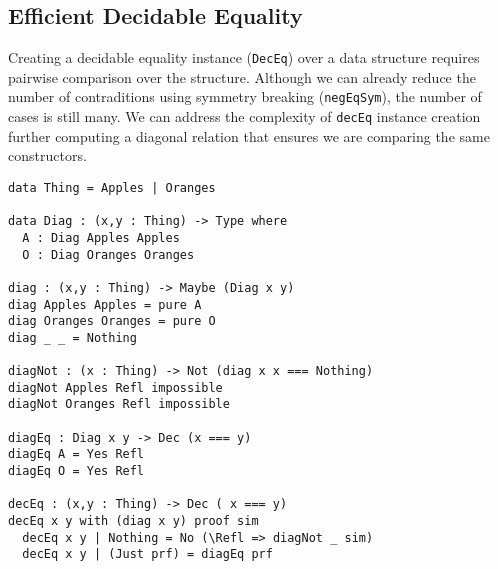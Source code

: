
\subsection{Efficient Decidable Equality}
\label{sec:idioms:decEq}



Creating a decidable equality instance (\texttt{DecEq}) over a data structure requires pairwise comparison over the structure.
Although we can already reduce the number of contraditions using symmetry breaking (\texttt{negEqSym}), the number of cases is still many.
We can address the complexity of \texttt{decEq} instance creation further computing a diagonal relation that ensures we are comparing the same constructors.


\begin{verbatim}
data Thing = Apples | Oranges

data Diag : (x,y : Thing) -> Type where
  A : Diag Apples Apples
  O : Diag Oranges Oranges

diag : (x,y : Thing) -> Maybe (Diag x y)
diag Apples Apples = pure A
diag Oranges Oranges = pure O
diag _ _ = Nothing

diagNot : (x : Thing) -> Not (diag x x === Nothing)
diagNot Apples Refl impossible
diagNot Oranges Refl impossible

diagEq : Diag x y -> Dec (x === y)
diagEq A = Yes Refl
diagEq O = Yes Refl

decEq : (x,y : Thing) -> Dec ( x === y)
decEq x y with (diag x y) proof sim
  decEq x y | Nothing = No (\Refl => diagNot _ sim)
  decEq x y | (Just prf) = diagEq prf
\end{verbatim}
